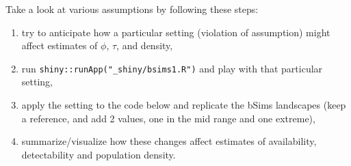 \documentclass[12pt,]{book}
\providecommand{\tightlist}{%
  \setlength{\itemsep}{0pt}\setlength{\parskip}{0pt}}
\begin{document}
Take a look at various assumptions by following these steps:

\begin{enumerate}
\def\labelenumi{\arabic{enumi}.}
\tightlist
\item
  try to anticipate how a particular setting (violation of assumption) might affect estimates of \(\phi\), \(\tau\), and density,
\item
  run \texttt{shiny::runApp("\_shiny/bsims1.R")} and play with that particular setting,
\item
  apply the setting to the code below and replicate the bSims landscapes (keep a reference, and add 2 values, one in the mid range and one extreme),
\item
  summarize/visualize how these changes affect estimates of availability, detectability and population density.
\end{enumerate}
\end{document}

